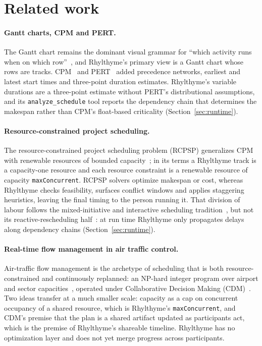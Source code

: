 \documentclass[10pt]{article}
\newcommand{\rt}{Rhylthyme}
\newcommand{\code}[1]{\texttt{#1}}
\begin{document}
\section{Related work}

\paragraph{Gantt charts, CPM and PERT.} The Gantt chart remains the dominant visual grammar for ``which activity runs when on which row''~\cite{wilson2003gantt}, and \rt{}'s primary view is a Gantt chart whose rows are tracks. CPM~\cite{kelley1959cpm} and PERT~\cite{malcolm1959pert} added precedence networks, earliest and latest start times and three-point duration estimates. \rt{}'s variable durations are a three-point estimate without PERT's distributional assumptions, and its \code{analyze\_schedule} tool reports the dependency chain that determines the makespan rather than CPM's float-based criticality (Section~\ref{sec:runtime}).

\paragraph{Resource-constrained project scheduling.} The resource-constrained project scheduling problem (RCPSP) generalizes CPM with renewable resources of bounded capacity~\cite{brucker1999rcpsp,kolisch2001survey,pinedo2016scheduling}; in its terms a \rt{} track is a capacity-one resource and each resource constraint is a renewable resource of capacity \code{maxConcurrent}. RCPSP solvers optimize makespan or cost, whereas \rt{} checks feasibility, surfaces conflict windows and applies staggering heuristics, leaving the final timing to the person running it. That division of labour follows the mixed-initiative and interactive scheduling tradition~\cite{hsu1993macmerl,norbis1996interactive,yu2017timing}, but not its reactive-rescheduling half~\cite{kelleher1997rescheduling}: at run time \rt{} only propagates delays along dependency chains (Section~\ref{sec:runtime}).

\paragraph{Real-time flow management in air traffic control.} Air-traffic flow management is the archetype of scheduling that is both resource-constrained and continuously replanned: an NP-hard integer program over airport and sector capacities~\cite{bertsimas1998atfm}, operated under Collaborative Decision Making (CDM)~\cite{ball2003groundholding,wambsganss1996cdm}. Two ideas transfer at a much smaller scale: capacity as a cap on concurrent occupancy of a shared resource, which is \rt{}'s \code{maxConcurrent}, and CDM's premise that the plan is a shared artifact updated as participants act, which is the premise of \rt{}'s shareable timeline. \rt{} has no optimization layer and does not yet merge progress across participants.
\end{document}
